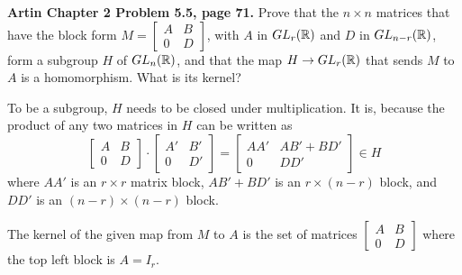 \documentclass{article}
\begin{document}
\bigskip
\begin{prob}
    \textbf{Artin Chapter 2 Problem 5.5, page 71.} Prove that the $n \times n$ matrices that have the block form $M=\begin{bmatrix}
        A & B \\
        0 & D
    \end{bmatrix}$, with $A$ in $GL_r(\mathbb{R})$ and $D$ in $GL_{n-r}(\mathbb{R})$, form a subgroup $H$ of $GL_n(\mathbb{R})$, and that the map $H \rightarrow GL_r(\mathbb{R})$ that sends $M$ to $A$ is a homomorphism. What is its kernel?
\end{prob}
To be a subgroup, $H$ needs to be closed under multiplication. It is, because the product of any two matrices in $H$ can be written as
\[ \begin{bmatrix}
    A & B \\
    0 & D
\end{bmatrix} \cdot \begin{bmatrix}
    A' & B' \\
    0 & D'
\end{bmatrix} = \begin{bmatrix}
    AA' & AB'+BD' \\
    0 & DD'
\end{bmatrix} \in H \]
where $AA'$ is an $r \times r$ matrix block, $AB'+BD'$ is an $r \times (n-r)$ block, and $DD'$ is an $(n-r) \times (n-r)$ block.
\par
The kernel of the given map from $M$ to $A$ is the set of matrices $ \begin{bmatrix}
    A & B \\
    0 & D
\end{bmatrix}$ where the top left block is $A = I_r$.
\end{document}

